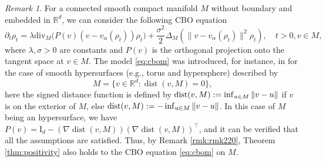 \documentclass[a4paper, 11pt]{article}
\newcounter{results}[section]
\theoremstyle{plain}
\theoremstyle{remark}
\newtheorem{remark}[results]{Remark}
\theoremstyle{definition}
\renewcommand{\div}{\mathrm{div}}
\begin{document}
\begin{remark}
{For a connected smooth compact manifold $M$ without boundary and embedded in $\mathbb R^d$, we can consider the following CBO equation
\begin{equation}\label{eq:cbom}
 \partial_t \rho_t=\lambda \div_{M}\Big(P(v)\left(v-v_{\alpha}\left(\rho_t\right)\right) \rho_t\Big)+\frac{\sigma^2}{2} \Delta_{M}\left(\|v-v_{\alpha}\left(\rho_t\right)\|^2 \rho_t\right), \quad t>0, v \in M,
 \end{equation}
 where $\lambda,\sigma>0$ are constants and $P(v)$ is the orthogonal projection onto the tangent space at $v \in M$. The model \eqref{eq:cbom} was introduced, for instance, in \cite{fornasier2020consensus_hypersurface_wellposedness} for the case of smooth hypersurfaces (e.g., torus and hypersphere) described by
 \begin{equation}
     M=\{v\in\mathbb{R}^d: \operatorname{dist}(v,M)=0\},
 \end{equation}
 here the signed distance function is defined by $\operatorname{dist}(v,M):=\inf_{u\in M}\norm{v-u}$ if $v$ is on the exterior of $M$, else $\operatorname{dist}(v,M):=-\inf_{u\in M}\norm{v-u}$.
In this case of $M$ being an hypersurface, we have  
 $P(v)=\mathrm{I}_d-(\nabla \operatorname{dist}(v,M))(\nabla \operatorname{dist}(v,M))^\top$, and it can be verified that all the assumptions are satisfied. Thus, by Remark \ref{rmk:rmk220}, Theorem \ref{thm:positivity} also holds to the CBO equation \eqref{eq:cbom} on $M$.
}
\end{remark}
\end{document}
